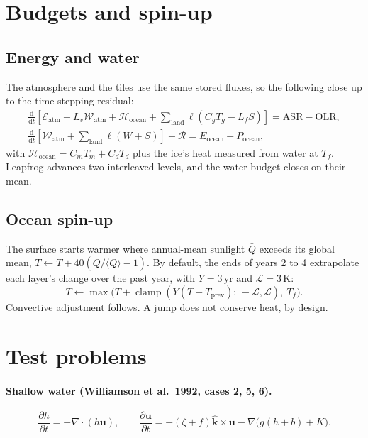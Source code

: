 \documentclass[11pt,a4paper]{article}
\newcommand{\dd}{\mathrm{d}}
\newcommand{\pd}[2]{\frac{\partial #1}{\partial #2}}
\newcommand{\dv}[2]{\frac{\dd #1}{\dd #2}}
\newcommand{\vect}[1]{\bm{#1}}
\newcommand{\kvec}{\hat{\vect{k}}}
\newcommand{\clamp}{\operatorname{clamp}}
\begin{document}
\section{Budgets and spin-up}

\subsection{Energy and water}
The atmosphere and the tiles use the same stored fluxes, so the following close up
to the time-stepping residual:
\begin{gather}
\dv{}{t}\left[\mathcal{E}_{\mathrm{atm}} + L_v\mathcal{W}_{\mathrm{atm}} + \mathcal{H}_{\mathrm{ocean}}
   + \sum_{\mathrm{land}}\ell(C_gT_g - L_fS)\right] = \mathrm{ASR} - \mathrm{OLR}, \\
\dv{}{t}\left[\mathcal{W}_{\mathrm{atm}} + \sum_{\mathrm{land}}\ell(W+S)\right]
   + \mathcal{R} = E_{\mathrm{ocean}} - P_{\mathrm{ocean}},
\end{gather}
with $\mathcal{H}_{\mathrm{ocean}} = C_mT_m + C_dT_d$ plus the ice's heat measured
from water at $T_f$. Leapfrog advances two interleaved levels, and the water budget
closes on their mean.

\subsection{Ocean spin-up}
The surface starts warmer where annual-mean sunlight $\bar Q$ exceeds its global
mean, $T \leftarrow T + 40(\bar Q/\langle\bar Q\rangle - 1)$. By default, the
ends of years 2 to 4 extrapolate each layer's change over the past year, with
$Y = 3$\,yr and $\mathcal{L} = 3$\,K:
\begin{equation}
T \leftarrow \max\bigl(T + \clamp(Y(T - T_{\mathrm{prev}});\,-\mathcal{L},\mathcal{L}),\ T_f\bigr).
\end{equation}
Convective adjustment follows. A jump does not conserve heat, by design.

\section{Test problems}

\paragraph{Shallow water (Williamson et al.\ 1992, cases 2, 5, 6).}
\begin{equation}
\pd{h}{t} = -\nabla\cdot(h\vect{u}), \qquad
\pd{\vect{u}}{t} = -(\zeta + f)\kvec\times\vect{u} - \nabla\bigl(g(h+b) + K\bigr).
\end{equation}
\end{document}
